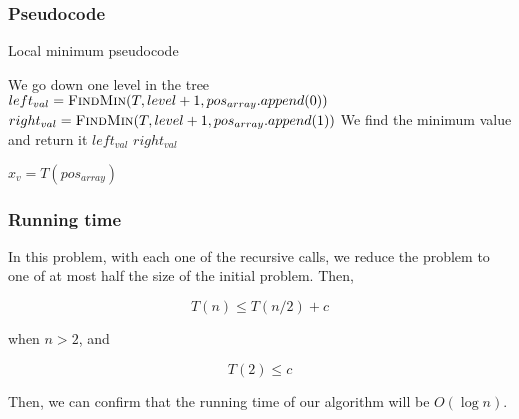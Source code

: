 \documentclass{article}
\begin{document}
\subsubsection*{Pseudocode}

\begin{algorithm}[H]
\caption{Local minimum pseudocode}
\begin{algorithmic}[1]
  \State We go down one level in the tree
  \State $left_{val} = \Call{FindMin}{T,level+1,pos_{array}.append(0)}$
  \State $right_{val} = \Call{FindMin}{T,level+1,pos_{array}.append(1)}$
  \State
  \State We find the minimum value and return it
   \State \Return $left_{val}$
  \Else
   \State \Return $right_{val}$
  \EndIf
 \EndIf

  \State \Return $x_v = T(pos_{array})$
 \EndIf
\EndFunction
\end{algorithmic}
\end{algorithm}

\subsubsection*{Running time}

In this problem, with each one of the recursive calls, we reduce the problem to one of at most half the size of the initial problem. Then,

$$T(n)\leq T(n/2) + c$$

when $n>2$, and

$$T(2)\leq c$$

Then, we can confirm that the running time of our algorithm will be $O(\log n)$.
\end{document}
